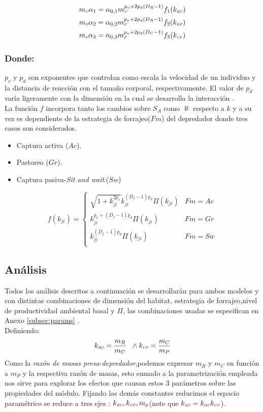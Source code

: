 \begin{equation}\label{eq:p4}
\begin{aligned}
&m_{\textit{\tiny C}} \alpha_1= \alpha_{0,1}m_{\textit{\tiny C}}^{p_v+2p_d(D_R-1)}f_1(k_{\textit{\tiny RC}})\\
&m_{\textit{\tiny P}} \alpha_2= \alpha_{0,2}m_{\textit{\tiny P}}^{p_v+2p_d(D_R-1)}f_2(k_{\textit{\tiny RP}})\\
&m_{\textit{\tiny P}} \alpha_3= \alpha_{0,3} m_{\textit{\tiny P}}^{p_v+2p_d(D_C-1)}f_3(k_{\textit{\tiny CP}})\\
\end{aligned}
\end{equation}
\subsubsection*{Donde:}
$p_v$ y $p_d$ son exponentes que controlan como escala la velocidad de un individuo  y la distancia de reacci\'on con el tama\~no corporal, respectivamente. El valor de $p_d$ var\'ia ligeramente con la dimensi\'on en la cual se desarrolla la interacci\'on \citep{pawar2012dimensionality}.\\
La funci\'on $f$ incorpora tanto los cambios sobre $S_A$ como $\aleph$ respecto a $k$ y a su vez es dependiente de la estrategia de forrajeo($Fm$) del depredador donde tres casos son considerados\citep{pawar2012dimensionality}.
\begin{itemize}
\item Captura activa ($Ac$).
\item Pastoreo ($Gr$).
\item Captura pasiva-\textit{Sit and wait}.($Sw$) 
\end{itemize}

\begin{equation}\label{eq:fkr}
f(k_{ji}) = 
\begin{cases}
\sqrt{1+k_{ji}^{2p_v}}k_{ji}^{(D_j-1)p_d} \Pi(k_{ji}) & Fm = Ac\\
k_{ji}^{p_v+(D_j-1)p_d}\Pi(k_{ji}) & Fm =Gr\\
k_{ji}^{(D_j-1)p_d}\Pi(k_{ji}) & Fm = Sw\\
\end{cases}
\end{equation}


\subsection{An\'alisis}
Todos los an\'alisis descritos a continuaci\'on se desarrollar\'an para ambos modelos y con distintas combinaciones de dimensi\'on del habitat, estrategia de forrajeo,nivel de productividad ambiental basal y $\Pi$, las combinaciones usadas se especifican en Anexo \ref{subsec:params} .\\
Definiendo:
\begin{equation}
  k_\RC = \frac{ m_R}{m_C} \ \ \land k_\CP = \frac{m_C}{m_P}
\end{equation}
Como la \emph{raz\'on de masas presa-depredador},podemos expresar $m_R$ y $m_C$ en funci\'on a $m_P$ y la respectiva raz\'on de masas, esto sumado a la parametrizaci\'on empleada nos sirve para explorar los efectos que causan estos 3 par\'ametros sobre las propiedades del m\'odulo. Fijando las dem\'as constantes reducimos el espacio param\'etrico se reduce a tres ejes : $k_{\textit{\tiny RC}},k_{\textit{\tiny CP}}, m_p$(note que $k_{\textit{\tiny RP}} = k_{\textit{\tiny RC}} k_{\textit{\tiny CP}}$).

